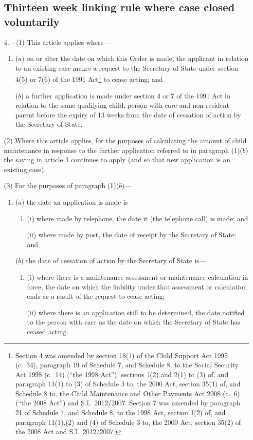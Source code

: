 \documentclass[12pt,a4paper]{article}
\begin{document}
\subsection[4. Thirteen week linking rule where case closed voluntarily]{Thirteen week linking rule where case closed voluntarily}

4.---(1)  This article applies where—
\begin{enumerate}\item[]
($a$) on or after the date on which this Order is made, the applicant in relation to an existing case makes a request to the Secretary of State under section 4(5) or 7(6) of the 1991 Act\footnote{Section 4 was amended by section 18(1) of the Child Support Act 1995 (c.~34), paragraph 19 of Schedule 7, and Schedule 8, to the Social Security Act 1998 (c.~14) (“the 1998 Act”), sections 1(2) and 2(1) to (3) of, and paragraph 11(1) to (3) of Schedule 3 to, the 2000 Act, section 35(1) of, and Schedule 8 to, the Child Maintenance and Other Payments Act 2008 (c.~6) (“the 2008 Act”) and S.I.~2012/2007. Section 7 was amended by paragraph 21 of Schedule 7, and Schedule 8, to the 1998 Act, section 1(2) of, and paragraph 11(1),(2) and (4) of Schedule 3 to, the 2000 Act, section 35(2) of the 2008 Act and S.I.~2012/2007.} to cease acting; and

($b$) a further application is made under section 4 or 7 of the 1991 Act in relation to the same qualifying child, person with care and non-resident parent before the expiry of 13 weeks from the date of cessation of action by the Secretary of State.
\end{enumerate}

(2) Where this article applies, for the purposes of calculating the amount of child maintenance in response to the further application referred to in paragraph (1)($b$)  the saving in article 3 continues to apply (and so that new application is an existing case).

(3) For the purposes of paragraph (1)($b$)—
\begin{enumerate}\item[]
($a$) the date an application is made is—
\begin{enumerate}\item[]
(i) where made by telephone, the date it (the telephone call) is made; and

(ii) where made by post, the date of receipt by the Secretary of State; and
\end{enumerate}

($b$) the date of cessation of action by the Secretary of State is—
\begin{enumerate}\item[]
(i) where there is a maintenance assessment or maintenance calculation in force, the date on which the liability under that assessment or calculation ends as a result of the request to cease acting;

(ii) where there is an application still to be determined, the date notified to the person with care as the date on which the Secretary of State has ceased acting.
\end{enumerate}
\end{enumerate}
\end{document}
